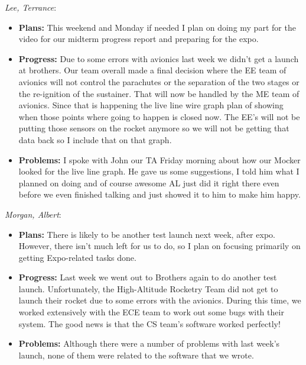 \documentclass[10pt,draftclsnofoot,onecolumn]{IEEEtran}
\newcommand{\subsubsubsection}[1]{
	\hfill\break\textit{#1}:
}
\begin{document}
\subsubsubsection{Lee, Terrance}
\begin{itemize}
	\item \textbf{Plans: }
	This weekend and Monday if needed I plan on doing my part for the video for our midterm progress report and preparing for the expo.
	\item \textbf{Progress:  }
	Due to some errors with avionics last week we didn't get a launch at brothers. Our team overall made a final decision where the EE team of avionics will not control the parachutes or the separation of the two stages or the re-ignition of the sustainer. That will now be handled by the ME team of avionics. Since that is happening the live line wire graph plan of showing when those points where going to happen is closed now. The EE's will not be putting those sensors on the rocket anymore so we will not be getting that data back so I include that on that graph.
	\item \textbf{Problems: }
	I spoke with John our TA Friday morning about how our Mocker looked for the live line graph. He gave us some suggestions, I told him what I planned on doing and of course awesome AL just did it right there even before we even finished talking and just showed it to him to make him happy.
\end{itemize}


\subsubsubsection{Morgan, Albert}
\begin{itemize}
	\item \textbf{Plans: }
	There is likely to be another test launch next week, after expo. However, there isn't much left for us to do, so I plan on focusing primarily on getting Expo-related tasks done.
	\item \textbf{Progress: }
	Last week we went out to Brothers again to do another test launch. Unfortunately, the High-Altitude Rocketry Team did not get to launch their rocket due to some errors with the avionics. During this time, we worked extensively with the ECE team to work out some bugs with their system. The good news is that the CS team's software worked perfectly!
	\item \textbf{Problems: }
	Although there were a number of problems with last week's launch, none of them were related to the software that we wrote.
\end{itemize}
\end{document}
